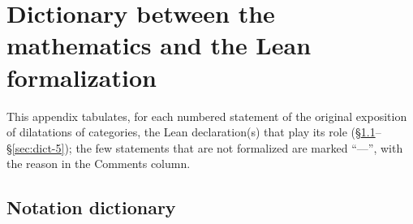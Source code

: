 \documentclass[11pt]{amsart}
\theoremstyle{plain}
\theoremstyle{definition}
\theoremstyle{remark}
\begin{document}
\appendix
\section{Dictionary between the mathematics and the Lean formalization}
\label{app:dictionary}

This appendix tabulates, for each numbered statement of the original exposition of
dilatations of categories, the Lean declaration(s) that play its role
(\S\ref{sec:dict-notation}--\S\ref{sec:dict-5}); the few statements that are not formalized
are marked ``---'', with the reason in the Comments column.

\subsection{Notation dictionary}
\label{sec:dict-notation}
\end{document}
